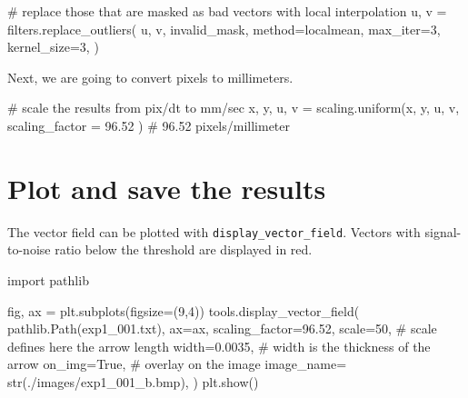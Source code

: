 \documentclass[
  english,
  letterpaper,
  numbers=noendperiod,
  DIV=13]{scrreprt}
\newenvironment{Shaded}{\begin{snugshade}}{\end{snugshade}}
\newcommand{\BuiltInTok}[1]{\textcolor[rgb]{0.00,0.23,0.31}{#1}}
\newcommand{\CommentTok}[1]{\textcolor[rgb]{0.37,0.37,0.37}{#1}}
\newcommand{\DecValTok}[1]{\textcolor[rgb]{0.68,0.00,0.00}{#1}}
\newcommand{\FloatTok}[1]{\textcolor[rgb]{0.68,0.00,0.00}{#1}}
\newcommand{\ImportTok}[1]{\textcolor[rgb]{0.00,0.46,0.62}{#1}}
\newcommand{\NormalTok}[1]{\textcolor[rgb]{0.00,0.23,0.31}{#1}}
\newcommand{\OperatorTok}[1]{\textcolor[rgb]{0.37,0.37,0.37}{#1}}
\newcommand{\StringTok}[1]{\textcolor[rgb]{0.13,0.47,0.30}{#1}}
\newcommand{\VariableTok}[1]{\textcolor[rgb]{0.07,0.07,0.07}{#1}}
\begin{document}
\begin{Shaded}
\begin{Highlighting}[]
\CommentTok{\# replace those that are masked as bad vectors with local interpolation}
\NormalTok{u, v }\OperatorTok{=}\NormalTok{ filters.replace\_outliers(}
\NormalTok{    u, v,}
\NormalTok{    invalid\_mask,}
\NormalTok{    method}\OperatorTok{=}\StringTok{\textquotesingle{}localmean\textquotesingle{}}\NormalTok{,}
\NormalTok{    max\_iter}\OperatorTok{=}\DecValTok{3}\NormalTok{,}
\NormalTok{    kernel\_size}\OperatorTok{=}\DecValTok{3}\NormalTok{,}
\NormalTok{)}
\end{Highlighting}
\end{Shaded}

Next, we are going to convert pixels to millimeters.

\begin{Shaded}
\begin{Highlighting}[]
\CommentTok{\# scale the results from pix/dt to mm/sec}
\NormalTok{x, y, u, v }\OperatorTok{=}\NormalTok{ scaling.uniform(x, y, u, v, scaling\_factor }\OperatorTok{=} \FloatTok{96.52}\NormalTok{ ) }\CommentTok{\# 96.52 pixels/millimeter}
\end{Highlighting}
\end{Shaded}

\section{Plot and save the results}\label{plot-and-save-the-results}

The vector field can be plotted with \texttt{display\_vector\_field}.
Vectors with signal-to-noise ratio below the threshold are displayed in
red.

\begin{Shaded}
\begin{Highlighting}[]
\ImportTok{import}\NormalTok{ pathlib}

\NormalTok{fig, ax }\OperatorTok{=}\NormalTok{ plt.subplots(figsize}\OperatorTok{=}\NormalTok{(}\DecValTok{9}\NormalTok{,}\DecValTok{4}\NormalTok{))}
\NormalTok{tools.display\_vector\_field(}
\NormalTok{    pathlib.Path(}\StringTok{\textquotesingle{}exp1\_001.txt\textquotesingle{}}\NormalTok{),}
\NormalTok{    ax}\OperatorTok{=}\NormalTok{ax, scaling\_factor}\OperatorTok{=}\FloatTok{96.52}\NormalTok{,}
\NormalTok{    scale}\OperatorTok{=}\DecValTok{50}\NormalTok{, }\CommentTok{\# scale defines here the arrow length}
\NormalTok{    width}\OperatorTok{=}\FloatTok{0.0035}\NormalTok{, }\CommentTok{\# width is the thickness of the arrow}
\NormalTok{    on\_img}\OperatorTok{=}\VariableTok{True}\NormalTok{, }\CommentTok{\# overlay on the image}
\NormalTok{    image\_name}\OperatorTok{=} \BuiltInTok{str}\NormalTok{(}\StringTok{\textquotesingle{}./images/exp1\_001\_b.bmp\textquotesingle{}}\NormalTok{),}
\NormalTok{)}
\NormalTok{plt.show()}
\end{Highlighting}
\end{Shaded}
\end{document}
